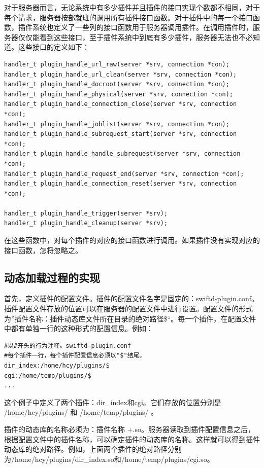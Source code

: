 \documentclass[12pt, twoside, a4paper, xetex]{report}
\begin{document}
	对于服务器而言，无论系统中有多少插件并且插件的接口实现个数都不相同，对于每个请求，服务器按部就班的调用所有插件接口函数。对于插件中的每一个接口函数，插件系统也定义了一些列的接口函数用于服务器调用插件。在调用插件时，服务器仅仅能看到这些接口，至于插件系统中到底有多少插件，服务器无法也不必知道。这些接口的定义如下：
	
\begin{verbatim}
handler_t plugin_handle_url_raw(server *srv, connection *con);
handler_t plugin_handle_url_clean(server *srv, connection *con);
handler_t plugin_handle_docroot(server *srv, connection *con);
handler_t plugin_handle_physical(server *srv, connection *con);
handler_t plugin_handle_connection_close(server *srv, connection *con);
handler_t plugin_handle_joblist(server *srv, connection *con);
handler_t plugin_handle_subrequest_start(server *srv, connection *con);
handler_t plugin_handle_handle_subrequest(server *srv, connection *con);
handler_t plugin_handle_request_end(server *srv, connection *con);
handler_t plugin_handle_connection_reset(server *srv, connection *con);

handler_t plugin_handle_trigger(server *srv);
handler_t plugin_handle_cleanup(server *srv);
\end{verbatim}
	在这些函数中，对每个插件的对应的接口函数进行调用。如果插件没有实现对应的接口函数，怎将忽略之。
	
\subsection{动态加载过程的实现}
	首先，定义插件的配置文件。插件的配置文件名字是固定的：swiftd-plugin.conf。插件配置文件存放的位置可以在服务器的配置文件中进行设置。配置文件的形式为”插件名称：插件动态库文件所在目录的绝对路径\$“。每一个插件，在配置文件中都有单独一行的这种形式的配置信息。例如：
	
	\begin{verbatim}
#以#开头的行为注释。swiftd-plugin.conf
#每个插件一行，每个插件配置信息必须以"$"结尾。
dir_index:/home/hcy/plugins/$
cgi:/home/temp/plugins/$
...
	\end{verbatim}

	这个例子中定义了两个插件：dir\_index和cgi。它们存放的位置分别是 /home/hcy/plugins/ 和 /home/temp/plugins/ 。
	
	插件的动态库的名称必须为：插件名称 +.so。服务器读取到插件配置信息之后，根据配置文件中的插件名称，可以确定插件的动态库的名称。这样就可以得到插件动态库的绝对路径。例如，上面两个插件的绝对路径分别为/home/hcy/plugins/dir\_index.so和/home/temp/plugins/cgi.so。
	
\end{document}
